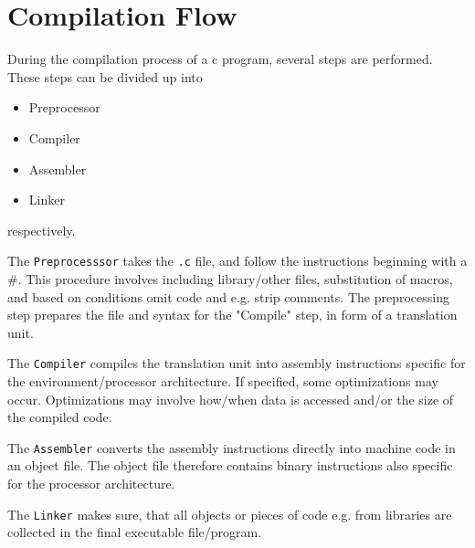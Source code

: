 \section{Compilation Flow}

During the compilation process of a c program, several steps are performed. These steps can be divided up into 

\begin{itemize}
    \item Preprocessor
    \item Compiler
    \item Assembler
    \item Linker
\end{itemize}

respectively. 

The \texttt{Preprocesssor} takes the \texttt{.c} file, and follow the instructions beginning with a $\#$. This procedure involves including library/other files, substitution of macros, and based on conditions omit code and e.g. strip comments. The preprocessing step prepares the file and syntax for the "Compile" step, in form of a translation unit. 

The \texttt{Compiler} compiles the translation unit into assembly instructions specific for the environment/processor architecture. If specified, some optimizations may occur. Optimizations may involve how/when data is accessed and/or the size of the compiled code.

The \texttt{Assembler} converts the assembly instructions directly into machine code in an object file. The object file therefore contains binary instructions also specific for the processor architecture. 

The \texttt{Linker} makes sure, that all objects or pieces of code e.g. from libraries are collected in the final executable file/program.